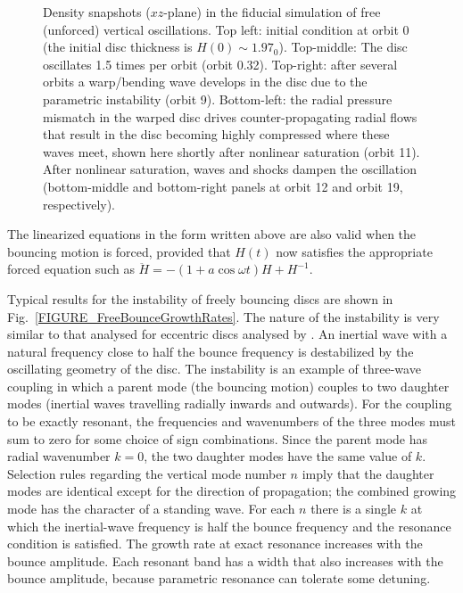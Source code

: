 \documentclass[fleqn,usenatbib]{mnras}
\begin{document}
\begin{figure}
\caption{Density snapshots ($xz$-plane) in the fiducial simulation of free (unforced) vertical oscillations. Top left: initial condition at orbit 0 (the initial disc thickness is $H(0)\sim 1.97_0$). Top-middle: The disc oscillates 1.5 times per orbit (orbit 0.32). Top-right: after several orbits a warp/bending wave develops in the disc due to the parametric instability (orbit 9). Bottom-left: the radial pressure mismatch in the warped disc drives counter-propagating radial flows that result in the disc becoming highly compressed where these waves meet, shown here shortly after nonlinear saturation (orbit 11). After nonlinear saturation, waves and shocks dampen the oscillation (bottom-middle and bottom-right panels at orbit 12 and orbit 19, respectively).}
\label{FIGURE_FiducialSimulationFlowField}
\end{figure}

The linearized equations in the form written above are also valid when the bouncing motion is forced, provided that $H(t)$ now satisfies the appropriate forced equation such as $\ddot H=-(1+a\cos\omega t)H+H^{-1}$.

Typical results for the instability of freely bouncing discs are shown in Fig.~\ref{FIGURE_FreeBounceGrowthRates}. The nature of the instability is very similar to that analysed for eccentric discs analysed by \citet{barker2014hydrodynamic}. An inertial wave with a natural frequency close to half the bounce frequency is destabilized by the oscillating geometry of the disc. The instability is an example of three-wave coupling in which a parent mode (the bouncing motion) couples to two daughter modes (inertial waves travelling radially inwards and outwards). For the coupling to be exactly resonant, the frequencies and wavenumbers of the three modes must sum to zero for some choice of sign combinations. Since the parent mode has radial wavenumber $k=0$, the two daughter modes have the same value of $k$. Selection rules regarding the vertical mode number $n$ imply that the daughter modes are identical except for the direction of propagation; the combined growing mode has the character of a standing wave. For each $n$ there is a single $k$ at which the inertial-wave frequency is half the bounce frequency and the resonance condition is satisfied. The growth rate at exact resonance increases with the bounce amplitude. Each resonant band has a width that also increases with the bounce amplitude, because parametric resonance can tolerate some detuning.
\end{document}
